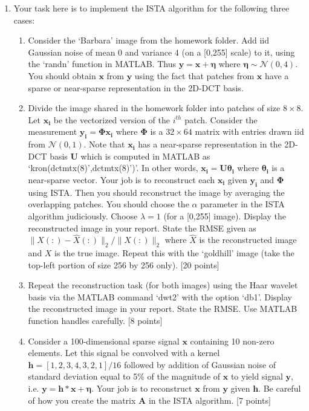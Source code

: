\documentclass[11pt]{article}
\begin{document}
\begin{enumerate}
\item Your task here is to implement the ISTA algorithm for the following three cases:
\begin{enumerate}
\item Consider the `Barbara' image from the homework folder. Add iid Gaussian noise of mean 0 and variance 4 (on a [0,255] scale) to it, using the `randn' function in MATLAB. Thus $\boldsymbol{y} = \boldsymbol{x} + \boldsymbol{\eta}$ where $\boldsymbol{\eta} \sim \mathcal{N}(0,4)$. You should obtain $\boldsymbol{x}$ from $\boldsymbol{y}$ using the fact that patches from $\boldsymbol{x}$ have a sparse or near-sparse representation in the 2D-DCT basis. 
\item Divide the image shared in the homework folder into patches of size $8 \times 8$. Let $\boldsymbol{x_i}$ be the vectorized version of the $i^{th}$ patch. Consider the measurement $\boldsymbol{y_i} = \boldsymbol{\Phi x_i}$ where $\boldsymbol{\Phi}$ is a $32 \times 64$ matrix with entries drawn iid from $\mathcal{N}(0,1)$. Note that $\boldsymbol{x_i}$ has a near-sparse representation in the 2D-DCT basis $\boldsymbol{U}$ which is computed in MATLAB as `kron(dctmtx(8)',dctmtx(8)')'. In other words, $\boldsymbol{x_i} = \boldsymbol{U \theta_i}$ where $\boldsymbol{\theta_i}$ is a near-sparse vector. Your job is to reconstruct each $\boldsymbol{x_i}$ given $\boldsymbol{y_i}$ and $\boldsymbol{\Phi}$ using ISTA. Then you should reconstruct the image by averaging the overlapping patches. You should choose the $\alpha$ parameter in the ISTA algorithm judiciously. Choose $\lambda = 1$ (for a [0,255] image). Display the reconstructed image in your report. State the RMSE given as $\|X(:)-\hat{X}(:)\|_2/\|X(:)\|_2$ where $\hat{X}$ is the reconstructed image and $X$ is the true image. Repeat this with the `goldhill' image (take the top-left portion of size 256 by 256 only). \textsf{[20 points]}
\item Repeat the reconstruction task (for both images) using the Haar wavelet basis via the MATLAB command `dwt2' with the option `db1'. Display the reconstructed image in your report. State the RMSE. Use MATLAB function handles carefully. \textsf{[8 points]}
\item Consider a 100-dimensional sparse signal $\boldsymbol{x}$ containing 10 non-zero elements. Let this signal be convolved with a kernel $\boldsymbol{h} = [1,2,3,4,3,2,1]/16$ followed by addition of Gaussian noise of standard deviation equal to 5\% of the magnitude of $\boldsymbol{x}$ to yield signal $\boldsymbol{y}$, i.e. $\boldsymbol{y} = \boldsymbol{h}*\boldsymbol{x} + \boldsymbol{\eta}$. Your job is to reconstruct $\boldsymbol{x}$ from $\boldsymbol{y}$ given $\boldsymbol{h}$. Be careful of how you create the matrix $\boldsymbol{A}$ in the ISTA algorithm. \textsf{[7 points]}
\end{enumerate}


\end{enumerate}
\end{document}
